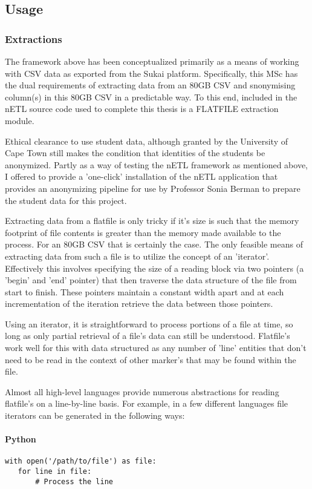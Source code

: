 \subsection{Usage}

\subsubsection{Extractions}
The framework above has been conceptualized primarily as a means of working with CSV data as exported from the Sukai platform. Specifically, this MSc has the dual requirements of extracting data from an 80GB CSV and snonymising column(s) in this 80GB CSV in a predictable way. To this end, included in the nETL source code used to complete this thesis is a FLATFILE extraction module.

Ethical clearance to use student data, although granted by the University of Cape Town still makes the condition that identities of the students be anonymized. Partly as a way of testing the nETL framework as mentioned above, I offered to provide a 'one-click' installation of the nETL application that provides an anonymizing pipeline for use by Professor Sonia Berman to prepare the student data for this project.

Extracting data from a flatfile is only tricky if it's size is such that the memory footprint of file contents is greater than the memory made available to the process. For an 80GB CSV that is certainly the case. The only feasible means of extracting data from such a file is to utilize the concept of an 'iterator'. Effectively this involves specifying the size of a reading block via two pointers (a 'begin' and 'end' pointer) that then traverse the data structure of the file from start to finish. These pointers maintain a constant width apart and at each incrementation of the iteration retrieve the data between those pointers.

Using an iterator, it is straightforward to process portions of a file at time, so long as only partial retrieval of a file's data can still be understood. Flatfile's work well for this with data structured as any number of 'line' entities that don't need to be read in the context of other marker's that may be found within the file.

Almost all high-level languages provide numerous abstractions for reading flatfile's on a line-by-line basis. For example, in a few different languages file iterators can be generated in the following ways:

\paragraph*{Python}
\begin{verbatim}
with open('/path/to/file') as file:
   for line in file:
       # Process the line
\end{verbatim}

